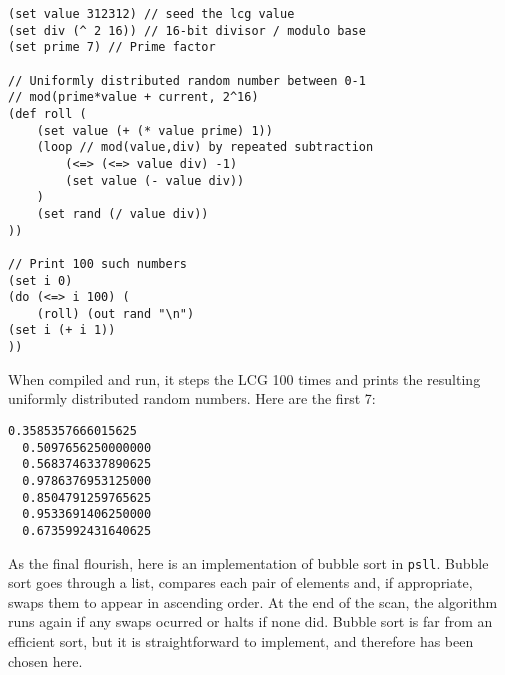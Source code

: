 \documentclass[aip,jcp,reprint,footinbib]{revtex4-1}
\makeatletter
\newcommand\psll{\texttt{psll}\xspace}
\renewcommand\paragraph{\@startsection{paragraph}{4}{\parindent}{\parskip}{-1em}{\normalfont \normalsize \bfseries}}
\makeatother
\begin{document}
\begin{lstlisting}[language=psll,aboveskip=3mm,belowskip=3mm,
    label=lst:lcg,caption={Simple linear congruential pseudo-random number generator. \href{https://tio.run/\%23\%23jVbbbsIwDH3PV/h5qDJl0vay7UuiSIhWAgkGgoG0r@@aOBc7l7JI0Do9SU5Pjp1efq/b02Hobrv9eBqnCagZ@hkWxmYUXRE0QGegY2Foc6D8DXgYhbfxRycQeBjC3J9wprPNJJTHUb97Yn94sFPhWicYAQOVyLCzHOkfI8cZ6dkBvvYbxjKtO5w9FB/b433Uc@8MBS3eNtDy5JS/AX8NixQiJZXkooH9x@eXhlKsDExwIRnXrEBbvFcuygQlHtm9dtJhv17rXMGWCECC23FGiMNfXkrRuo9DhHlEJCS2/UqwMpWIK20EN1oejebRu84E9xKugs@Hw0O7iQxzvXx9w3r8YmSQDfkJL9fDaQyUcjXsgthzye3Q/s3tDinNpcPzneTxTpTWiQNy/Uy@TWVLyuFVV11cNyluv4f5f7e/LuBRmC4kUZuPsOlCYi35FJy3m0MaRnXjVZPUYuZWsj0WQbUoIn@Fmioo1KANaughpaPdsb01MIpIi8wuaGAWi0RqlLwcTxK6rFJP4A5I5bncE6xuUEgZ9RS5VOS6/xQ2aNR76ZHCPUqaom0eJZmZtneULCcr3baO4gxNMa19cjyfLxGbTkdXo9rppkLi@GMxq0LNw3EGv0D2uJ1jpRgI82HayjTxuVCZIM83FB4tZ2CR1zzIEwt8ONux693HRJiwC0Oybwh2dpF4fsbFci3ZJN2XijbLu3pvtTyx7Kv31kaxY6vsnabpDw}{Try it online!}
    }]
(set value 312312) // seed the lcg value
(set div (^ 2 16)) // 16-bit divisor / modulo base
(set prime 7) // Prime factor

// Uniformly distributed random number between 0-1
// mod(prime*value + current, 2^16)
(def roll (
    (set value (+ (* value prime) 1))
    (loop // mod(value,div) by repeated subtraction
        (<=> (<=> value div) -1)
        (set value (- value div))
    )
    (set rand (/ value div))
))

// Print 100 such numbers
(set i 0)
(do (<=> i 100) (
    (roll) (out rand "\n")
(set i (+ i 1))
))
\end{lstlisting}

When compiled and run, it steps the LCG 100 times and prints the resulting uniformly distributed random numbers. Here are the first 7:
\begin{lstlisting}[aboveskip=3pt,belowskip=-2pt,frame=none,numbers=none]
  0.3585357666015625
  0.5097656250000000
  0.5683746337890625
  0.9786376953125000
  0.8504791259765625
  0.9533691406250000
  0.6735992431640625
\end{lstlisting}


\paragraph{Bubble sort} As the final flourish, here is an implementation of bubble sort in \psll. Bubble sort goes through a list, compares each pair of elements and, if appropriate, swaps them to appear in ascending order. At the end of the scan, the algorithm runs again if any swaps ocurred or halts if none did. Bubble sort is far from an efficient sort, but it is straightforward to implement, and therefore has been chosen here.
\end{document}
